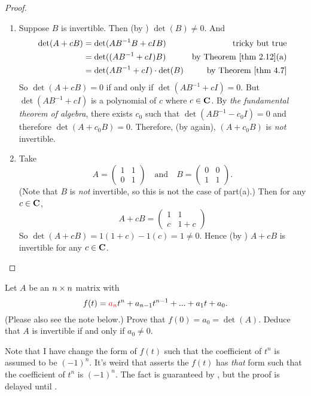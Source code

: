 \begin{proof} \ 

\begin{enumerate}
\item Suppose \(B\) is invertible.
Then (by ) \(\det(B) \ne 0\).
And
\begin{align*}
    \det(A + cB) & = \det(AB^{-1}B + cIB) & \text{tricky but true} \\
        & = \det((AB^{-1} + cI)B) & \text{by \THM{2.12}(a)} \\
        & = \det(AB^{-1} + cI) \cdot \det(B) & \text{by \THM{4.7}}
\end{align*}
So \(\det(A + cB) = 0\) if and only if \(\det(AB^{-1} + cI) = 0\).
But \(\det(AB^{-1} + cI)\) is a polynomial of \(c\) where \(c \in \mathbf{C}\).
By \emph{the fundamental theorem of algebra}, there exists \(c_0\) such that \(\det(AB^{-1} - c_0I) = 0\) and therefore \(\det(A + c_0 B) = 0\).
Therefore, (by  again), \((A + c_0B)\) is \emph{not} invertible.

\item
Take
\[
    A = \begin{pmatrix} 1 & 1 \\ 0 & 1 \end{pmatrix}
    \quad \text{and} \quad
    B = \begin{pmatrix} 0 & 0 \\ 1 & 1 \end{pmatrix}.
\]
(Note that \(B\) is \emph{not} invertible, so this is not the case of part(a).)
Then for any \(c \in \mathbf{C}\),
\[
    A + cB = \begin{pmatrix} 1 & 1 \\ c & 1 + c \end{pmatrix}
\]
So \(\det(A + cB) = 1(1 + c) - 1(c) = 1 \ne 0\).
Hence (by ) \(A + cB\) is invertible for any \(c \in \mathbf{C}\).
\end{enumerate}
\end{proof}

\begin{exercise} \label{exercise 5.1.20}
Let \(A\) be an \(n \times n\) matrix with \CPOLY{}
\[
    f(t) = \RED{a_n} t^n + a_{n - 1}t^{n - 1} + ... + a_1 t + a_0.
\]
(Please also see the note below.)
Prove that \(f(0) = a_0 = \det(A)\).
Deduce that \(A\) is invertible if and only if \(a_0 \ne 0\).
\end{exercise}

\begin{note}
Note that I have change the form of \(f(t)\) such that the coefficient of \(t^n\) is  assumed to be \((-1)^n\).
It's weird that  asserts the \CPOLY{} \(f(t)\) has \emph{that} form such that the coefficient of \(t^n\) is \((-1)^n\).
The fact is guaranteed by , but the proof is delayed until .
\end{note}

